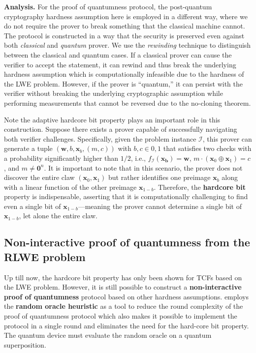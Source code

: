 \documentclass[cryptography,review,submit,pdftex,moreauthors,amsmath,amssymb,aps,strict]{Definitions/mdpi}
\begin{document}
\noindent\textbf{Analysis.} For the proof of quantumness protocol, the post-quantum cryptography hardness assumption here is employed in a different way, where we do not require the prover to break something that the classical machine cannot. The protocol is constructed in a way that the security is preserved even against both \textit{classical} and \textit{quantum} prover. We use the \textit{rewinding} technique to distinguish between the classical and quantum cases. If a classical prover can cause the verifier to accept the statement, it can rewind and thus break the underlying hardness assumption which is computationally infeasible due to the hardness of the LWE problem. However, if the prover is ``quantum,'' it can persist with the verifier without breaking the underlying cryptographic assumption while performing measurements that cannot be reversed due to the no-cloning theorem.

Note the adaptive hardcore bit property plays an important role in this construction. Suppose there exists a prover capable of successfully navigating both verifier challenges. Specifically, given the problem instance $\mathcal{I}$, this prover can generate a tuple $(\mathbf{w}, b, \mathbf{x}_b, (m, c))$ with $b,c \in {0,1}$ that satisfies two checks with a probability significantly higher than $1/2$, i.e., $f_{\mathcal{I}}(\mathbf{x_b}) = \mathbf{w}$, $m \cdot (\mathbf{x}_0 \oplus \mathbf{x}_1) = c$, and $m \neq \mathbf{0}^n$.
It is important to note that in this scenario, the prover does not discover the entire claw $(\mathbf{x}_0, \mathbf{x}_1)$ but rather identifies one preimage $\mathbf{x}_b$ along with a linear function of the other preimage $\mathbf{x}_{1-b}$. Therefore, the \textbf{hardcore bit} property is indispensable, asserting that it is computationally challenging to find even a single bit of $\mathbf{x}_{1-b}$—meaning the prover cannot determine a single bit of $\mathbf{x}_{1-b}$, let alone the entire claw. 


\subsection{Non-interactive proof of quantumness from the RLWE problem}

Up till now, the hardcore bit property has only been shown for TCFs based on the LWE problem. However, it is still possible to construct a \textbf{non-interactive proof of quantumness} protocol based on other hardness assumptions. \cite{BrakerskiProofofQuantumness} employs the \textbf{random oracle heuristic} as a tool to reduce the round complexity of the proof of quantumness protocol which also makes it possible to implement the protocol in a single round and eliminates the need for the hard-core bit property. The quantum device must evaluate the random oracle on a quantum superposition.
\end{document}
